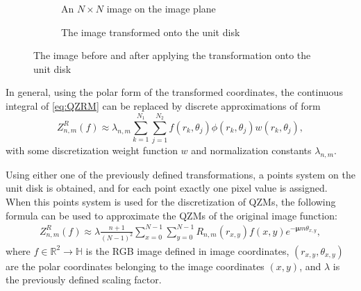\begin{figure}[tb]
  \begin{subfigure}{.43\textwidth}
  \centering
  \caption{An $N \times N$ image on the image plane}
  \end{subfigure}
  \begin{subfigure}{.05\textwidth}
    \centering
  \end{subfigure}
  \begin{subfigure}{.50\textwidth}
    \centering
    \caption{The image transformed onto the unit disk}
    \end{subfigure}
  \caption{The image before and after applying the transformation onto the unit disk}
  \label{fig:transform2}
\end{figure}

In general, using the polar form of the transformed coordinates, the continuous integral of \eqref{eq:QZRM} can be replaced by discrete approximations of form
\begin{equation}\label{eq:QZMappr}
	Z_{n,m}^R(f) \approx \lambda_{n,m} \sum_{k=1}^{N_1} \sum_{j=1}^{N_2} f(r_k,\theta_j) \phi(r_k,\theta_j) w(r_k,\theta_j),
\end{equation}
with some discretization weight function $w$ and normalization constants $\lambda_{n,m}$.

Using either one of the previously defined transformations, a points system on the unit disk is obtained, and for each point exactly one pixel value is assigned. When this points system is used for the discretization of QZMs, the following formula can be used to approximate the QZMs of the original image function:
\begin{gather*}
  Z_{n,m}^R(f) \approx \lambda\frac{n + 1}{(N - 1)^2}\sum_{x = 0}^{N-1}\sum_{y = 0}^{N-1}R_{n,m}(r_{x,y})f(x,y)e^{-\bm{\mu}m\theta_{x,y}},
\end{gather*}
where $f \in \mathds{R}^2 \rightarrow \mathds{H}$ is the RGB image defined in image coordinates, $(r_{x,y},\theta_{x,y})$ are the polar coordinates belonging to the image coordinates $(x,y)$, and $\lambda$ is the previously defined scaling factor.

